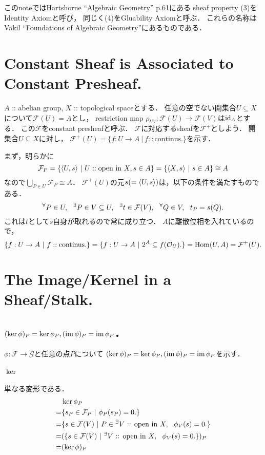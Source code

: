 \documentclass[a4paper]{jsarticle}
\newcommand{\shF}{\mathcal{F}}
\newcommand{\shG}{\mathcal{G}}
\newcommand{\OpenIn}{\text{ :: open in }}
\begin{document}
    このnoteではHartshorne ``Algebraic Geometry'' p.61にある
    sheaf property (3)をIdentity Axiomと呼び，
    同じく(4)をGluability Axiomと呼ぶ．
    これらの名称はVakil ``Foundations of Algebraic Geometry''にあるものである．

\section{Constant Sheaf is Associated to Constant Presheaf.} %
    $A$ :: abelian group, $X$ :: topological spaceとする．
    任意の空でない開集合$U \subseteq X$について$\shF(U)=A$とし，
    restriction map $\rho_{UV}: \shF(U) \to \shF(V)$は$\mathrm{id}_{A}$とする．
    この$\shF$をconstant presheafと呼ぶ．
    $\shF$に対応するsheafを$\shF^+$としよう．
    開集合$U \subseteq X$に対し，
    $\shF^+(U)=\{ f:U \to A ~|~ f :: \text{continus}. \}$を示す．

    まず，明らかに
    \[ \shF_P=\{ \reg{U}{s} ~|~ U :: \text{open in }X, s \in A\}=\{ \reg{X}{s} ~|~ s \in A\} \cong A \]
    なので$\bigcup_{P \in U} \shF_P \cong A$．
    $\shF^+(U)$の元$s(=\langle U,s \rangle)$は，以下の条件を満たすものである．
    \[ \Forall{P \in U} \Exists{P \in V \subseteq U} \Exists{t \in \shF(V)} \Forall{Q \in V}  t_P=s(Q). \]
    これは$t$として$s$自身が取れるので常に成り立つ．
    $A$に離散位相を入れているので，
    \[ \{ f:U \to A ~|~ f :: \text{continus}. \}=\{ f:U \to A ~|~ 2^A \subseteq f(\mathcal{O}_U). \}=\Hom(U,A)=\shF^+(U). \]

\section{The Image/Kernel in a Sheaf/Stalk.} %
    \subsection{$(\ker \phi)_P=\ker \phi_P, (\operatorname{im} \phi)_P=\operatorname{im} \phi_P$．}
    $\phi: \shF \to \shG$と任意の点$P$について
    $(\ker \phi)_P=\ker \phi_P, (\operatorname{im} \phi)_P=\operatorname{im} \phi_P$を示す．

    \paragraph{$\ker$}
    単なる変形である．
    \begin{align*}
        {}& \ker \phi_P \\
        =&  \{ s_P \in \shF_P ~|~ \phi_P(s_P)=0. \} \\
        =&  \{ s \in \shF(V) ~|~ P \in \Exists{V \OpenIn X} \phi_{V}(s)=0. \} \\
        =&  (\{ s \in \shF(V) ~|~ \Exists{V \OpenIn X} \phi_{V}(s)=0. \})_P \\
        =&  (\ker \phi)_P
    \end{align*}
\end{document}
